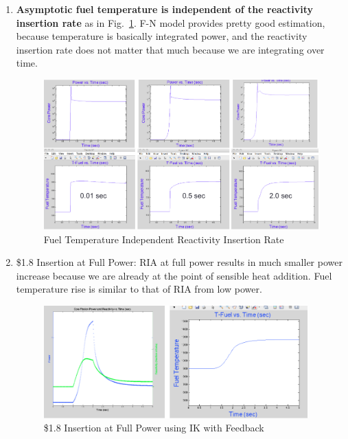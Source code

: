 \documentclass{school-22.211-notes}
\begin{document}
\clearpage
{}
\begin{enumerate}
\item \textbf{Asymptotic fuel temperature is independent of the reactivity insertion rate} as in Fig.~\ref{fn2}. F-N model provides pretty good estimation, because temperature is basically integrated power, and the reactivity insertion rate does not matter that much because we are integrating over time. 
  \begin{figure}[ht] 
    \centering
    \includegraphics[width=6in]{images/pke/fn2.png}
    \caption{Fuel Temperature Independent Reactivity Insertion Rate} \label{fn2}
  \end{figure}

\item \$1.8 Insertion at Full Power: RIA at full power results in much smaller power increase because we are already at the point of sensible heat addition. Fuel temperature rise is similar to that of RIA from low power. 
  \begin{figure}[ht] 
    \centering
    \includegraphics[width=4in]{images/pke/fn3.png}
    \caption{\$1.8 Insertion at Full Power using IK with Feedback}
  \end{figure}


\end{enumerate}
\end{document}
